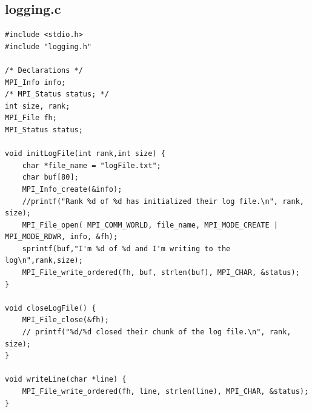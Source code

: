 \documentclass{article}
\begin{document}
\subsection*{logging.c}
\begin{lstlisting}
#include <stdio.h>
#include "logging.h"

/* Declarations */
MPI_Info info;
/* MPI_Status status; */
int size, rank;
MPI_File fh;
MPI_Status status;

void initLogFile(int rank,int size) {
    char *file_name = "logFile.txt";
    char buf[80];
    MPI_Info_create(&info);
    //printf("Rank %d of %d has initialized their log file.\n", rank, size);
    MPI_File_open( MPI_COMM_WORLD, file_name, MPI_MODE_CREATE | MPI_MODE_RDWR, info, &fh);
    sprintf(buf,"I'm %d of %d and I'm writing to the log\n",rank,size);
    MPI_File_write_ordered(fh, buf, strlen(buf), MPI_CHAR, &status); 
}

void closeLogFile() {
    MPI_File_close(&fh);
	// printf("%d/%d closed their chunk of the log file.\n", rank, size);
}

void writeLine(char *line) {
    MPI_File_write_ordered(fh, line, strlen(line), MPI_CHAR, &status);
}
\end{lstlisting}
\end{document}
